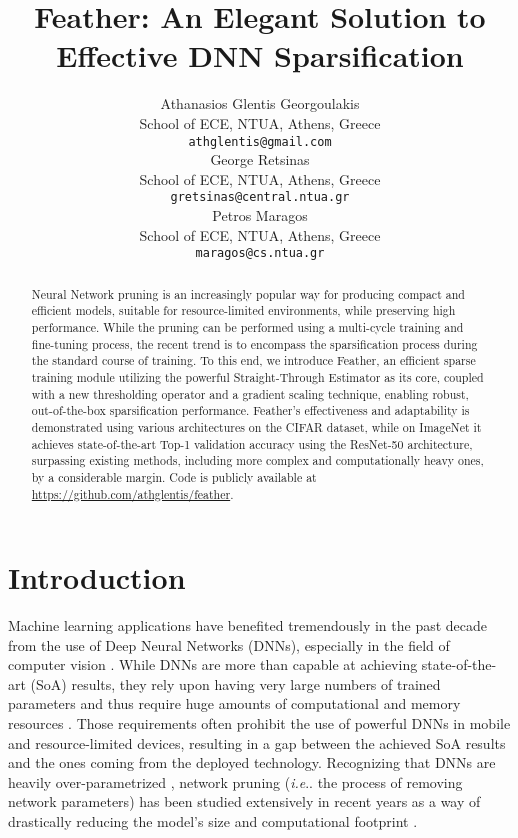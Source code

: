 \documentclass{article}
\title{Feather: An Elegant Solution to Effective DNN Sparsification}
\date{}
\author{ 
	Athanasios Glentis Georgoulakis\\
	School of ECE, NTUA, Athens, Greece \\
	\texttt{athglentis@gmail.com} \\
	\And
	George Retsinas \\
	School of ECE, NTUA, Athens, Greece \\
	\texttt{gretsinas@central.ntua.gr} \\
	\And
	Petros Maragos \\
	School of ECE, NTUA, Athens, Greece \\
	\texttt{maragos@cs.ntua.gr} \\
}
\makeatletter
\DeclareRobustCommand\onedot{\futurelet\@let@token\@onedot}
\def\@onedot{\ifx\@let@token.\else.\null\fi\xspace}
\def\ie{\emph{i.e}\onedot}
\makeatother
\begin{document}
\maketitle

\begin{abstract}
	Neural Network pruning is an increasingly popular way for producing compact and efficient models, suitable for resource-limited environments, while preserving high performance. While the pruning can be performed using a multi-cycle training and fine-tuning process, the recent trend is to encompass the sparsification process during the standard course of training. To this end, we introduce Feather, an efficient sparse training module utilizing the powerful Straight-Through Estimator as its core, coupled with a new thresholding operator and a gradient scaling technique, enabling robust, out-of-the-box sparsification performance. Feather’s effectiveness and adaptability is demonstrated using various architectures on the CIFAR dataset, while on ImageNet it achieves state-of-the-art Top-1 validation accuracy using the ResNet-50 architecture, surpassing existing methods, including more complex and computationally heavy ones, by a considerable margin. Code is publicly available at {\url{https://github.com/athglentis/feather}}.
 
 
\end{abstract}




\section{Introduction}

Machine learning applications have benefited tremendously in the past decade from the use of Deep Neural Networks (DNNs), especially in the field of computer vision \cite{lecun2015deep}. While DNNs are more than capable at achieving state-of-the-art (SoA) results, they rely upon having very large numbers of trained parameters and thus require huge amounts of computational and memory resources \cite{krizhevsky2012imagenet,  taigman2014deepface, he2016deep}. Those requirements often prohibit the use of powerful DNNs in mobile and resource-limited devices, resulting in a gap between the achieved SoA results and the ones coming from the deployed technology. 
Recognizing that DNNs are heavily over-parametrized \cite{sze2017efficient}, network pruning (\ie the process of removing network parameters) has been studied extensively in recent years as a way of drastically reducing the model's size and computational footprint \cite{cheng2018model, deng2020model,liang2021pruning, hoefler2021sparsity}. 
\end{document}
